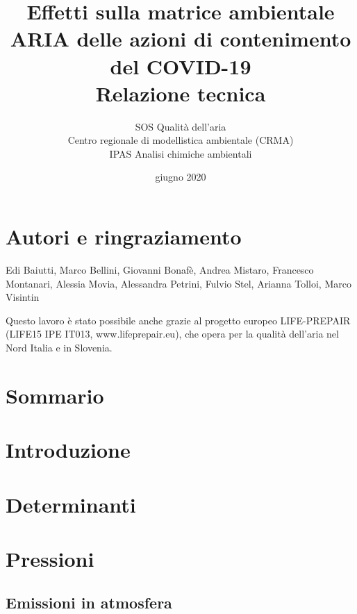 \documentclass[lualatex,12pt,a4paper]{article}
\begin{document}
\AddToShipoutPicture*{\BackgroundPic}
\title
{Effetti sulla matrice ambientale ARIA delle azioni di contenimento del COVID-19
 \\ 
\Large{Relazione tecnica}}
\author
{SOS Qualità dell'aria\\
 Centro regionale di modellistica ambientale (CRMA)\\
 IPAS Analisi chimiche ambientali
}
\date{giugno 2020}
\maketitle


\pagebreak
 \begingroup
   \hypersetup{hidelinks}
   \section*{Autori e ringraziamento}
   Edi Baiutti,
   Marco Bellini,
   Giovanni Bonafè,
   Andrea Mistaro,
   Francesco Montanari,
   Alessia Movia,
   Alessandra Petrini,
   Fulvio Stel,
   Arianna Tolloi,
   Marco Visintin
   
Questo lavoro è stato possibile anche grazie al progetto europeo LIFE-PREPAIR (LIFE15 IPE IT013, www.lifeprepair.eu), che opera per la qualità dell'aria nel Nord Italia e in Slovenia.

   \tableofcontents
   \listoffigures
   \listoftables
 \endgroup
\pagebreak

\section*{Sommario}\label{cap:intro}

\pagebreak

\section*{Introduzione}\label{cap:intro}


\FloatBarrier
\section{Determinanti}\label{cap:determinanti}

\FloatBarrier


\FloatBarrier
\section{Pressioni}\label{cap:pressioni}
\subsection{Emissioni in atmosfera}

\end{document}
